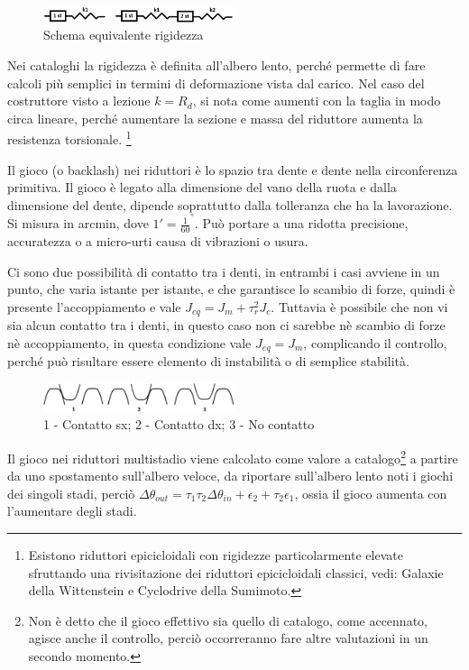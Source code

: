\begin{figure}[h]
    \centering
    \includegraphics[width=0.5\textwidth]{Immagini/rigidezza_1_2_stadi.png}
    \caption{Schema equivalente rigidezza}
\end{figure}

Nei cataloghi la rigidezza è definita all'albero lento, perché permette di fare calcoli più semplici in termini di deformazione vista dal carico.
Nel caso del costruttore visto a lezione $k=R_d$, si nota come aumenti con la taglia in modo circa lineare, perché aumentare la sezione e massa del riduttore aumenta la resistenza torsionale. \footnote{Esistono riduttori epicicloidali con rigidezze particolarmente elevate sfruttando una rivisitazione dei riduttori epicicloidali classici, vedi: Galaxie della Wittenstein e Cyclodrive della Sumimoto.}

Il gioco (o backlash) nei riduttori è lo spazio tra dente e dente nella circonferenza primitiva. Il gioco è legato alla dimensione del vano della ruota e dalla dimensione del dente, dipende soprattutto dalla tolleranza che ha la lavorazione.
Si misura in arcmin, dove $1'=\frac{1}{60}^°$.
Può portare a una ridotta precisione, accuratezza o a micro-urti causa di vibrazioni o usura. 

Ci sono due possibilità di contatto tra i denti, in entrambi i casi avviene in un punto, che varia istante per istante, e che garantisce lo scambio di forze, quindi è presente l'accoppiamento e vale $J_{eq}=J_m+\tau_r^2 J_c$. 
Tuttavia è possibile che non vi sia alcun contatto tra i denti, in questo caso non ci sarebbe nè scambio di forze nè accoppiamento, in questa condizione vale $J_{eq}=J_m$, complicando il controllo, perché può risultare essere elemento di instabilità o di semplice stabilità.

\begin{figure}[h]
    \centering
    \includegraphics[width=0.5\textwidth]{Immagini/config_denti_gioco.png}
    \caption{1 - Contatto sx; 2 - Contatto dx; 3 - No contatto}
\end{figure}

Il gioco nei riduttori multistadio viene calcolato come valore a catalogo\footnote{Non è detto che il gioco effettivo sia quello di catalogo, come accennato, agisce anche il controllo, perciò occorreranno fare altre valutazioni in un secondo momento.} a partire da uno spostamento sull'albero veloce, da riportare sull'albero lento noti i giochi dei singoli stadi, perciò \( \Delta \theta_{out} = \tau_1\tau_2\Delta \theta_{in} + \epsilon_2 +\tau_2\epsilon_1 \), ossia il gioco aumenta con l'aumentare degli stadi.

